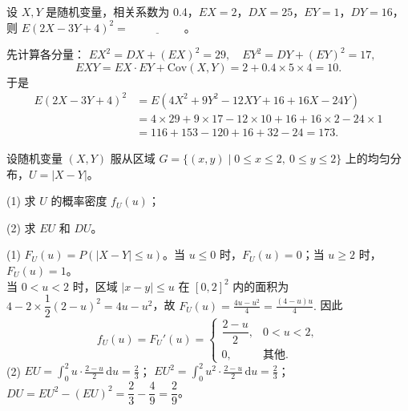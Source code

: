\documentclass[lang=cn,11pt]{elegantbook}
\begin{document}
\begin{exercise}\label{exer:4-7-square}
设 \(X, Y\) 是随机变量，相关系数为 0.4，\(EX = 2\)，\(DX = 25\)，\(EY = 1\)，\(DY = 16\)，则 \(E(2X - 3Y + 4)^2 =\,\underline{\hspace{2cm}}\)。
\end{exercise}

\begin{solution}
先计算各分量：
\(
EX^2 = DX + (EX)^2 = 29,\quad EY^2 = DY + (EY)^2 = 17,
\)
\[
EXY = EX \cdot EY + \mathrm{Cov}(X,Y) = 2 + 0.4 \times 5 \times 4 = 10.
\]
于是
\[
\begin{aligned}
E(2X-3Y+4)^2 &= E(4X^2 + 9Y^2 - 12XY + 16 + 16X - 24Y) \\
&= 4 \times 29 + 9 \times 17 - 12 \times 10 + 16 + 16 \times 2 - 24 \times 1 \\
&= 116 + 153 - 120 + 16 + 32 - 24 = 173.
\end{aligned}
\]
\end{solution}


\begin{exercise}\label{exer:4-3-abs}
设随机变量 \((X,Y)\) 服从区域 \(G = \{(x,y) \mid 0 \leqslant x \leqslant 2,\ 0 \leqslant y \leqslant 2\}\) 上的均匀分布，\(U = |X-Y|\)。\par
(1) 求 \(U\) 的概率密度 \(f_U(u)\)；\par
(2) 求 \(EU\) 和 \(DU\)。
\end{exercise}
\begin{solution}
(1) \(F_U(u) = P(|X-Y| \leqslant u)\)。当 \(u \leqslant 0\) 时，\(F_U(u) = 0\)；当 \(u \geqslant 2\) 时，\(F_U(u) = 1\)。\\
当 \(0 < u < 2\) 时，区域 \(|x-y| \leqslant u\) 在 \([0,2]^2\) 内的面积为 \(4 - 2 \times \dfrac{1}{2}(2-u)^2 = 4u - u^2\)，故
\(
F_U(u) = \frac{4u - u^2}{4} = \frac{(4-u)u}{4}.
\)
因此
\[
f_U(u) = F_U'(u) = \begin{cases} \dfrac{2-u}{2}, & 0 < u < 2, \\ 0, & \text{其他}. \end{cases}
\]
(2) \(EU = \displaystyle\int_0^2 u \cdot \frac{2-u}{2}\,\mathrm{d}u = \frac{2}{3}\)；
\(EU^2 = \displaystyle\int_0^2 u^2 \cdot \frac{2-u}{2}\,\mathrm{d}u = \frac{2}{3}\)；
\(DU = EU^2 - (EU)^2 = \dfrac{2}{3} - \dfrac{4}{9} = \dfrac{2}{9}\)。
\end{solution}
\end{document}
